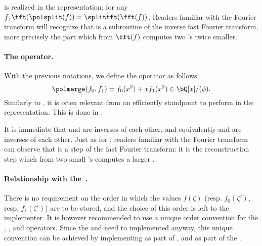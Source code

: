 \splitfft is \polsplit realized in the \fft representation: for any $f, \fft(\polsplit(f)) = \splitfft(\fft(f))$. Readers familiar with the Fourier transform will recognize that \splitfft is a subroutine of the inverse fast Fourier transform, more precisely the part which from $\fft(f)$ computes two \fft's twice smaller.

\paragraph{The \mergefft operator.} With the previous notations, we define the operator \polmerge as follows:
\begin{equation}\label{eq:merge}
\polmerge(f_0,f_1) = f_0(x^2) + xf_1(x^2) \in \bQ[x]/(\phi).
\end{equation}
Similarly to \polsplit, it is often relevant from an efficiently standpoint to perform \polmerge in the \fft representation. This is done in \longmergefft.

\begin{algorithm}%
\caption{$\mergefft(f_0,f_1)$}\label{alg:mergefft}
 \begin{algorithmic}[1]
 \EndFor
 \end{algorithmic}
\end{algorithm}

It is immediate that \polsplit and \polmerge are inverses of each other, and equivalently \splitfft and \mergefft are inverses of each other. Just as for \splitfft, readers familiar with the Fourier transform can observe that \mergefft is a step of the fast Fourier transform: it is the reconstruction step which from two small \fft's computes a larger \fft.

\paragraph{Relationship with the \fft.} There is no requirement on the order in which the values $f(\zeta)$ (resp. $f_0(\zeta')$, resp. $f_1(\zeta')$) are to be stored, and the choice of this order is left to the implementer. It is however recommended to use a unique order convention for the \fft, \ifft, \splitfft and \mergefft operators. Since the \fft and \ifft need to implemented anyway, this unique convention can be achieved \eg by implementing \splitfft as part of \ifft, and \mergefft as part of the \fft.

